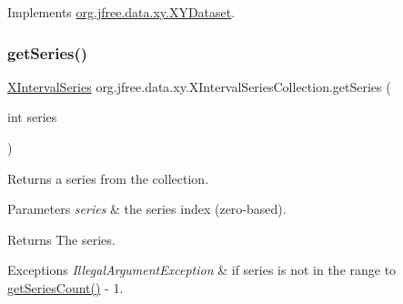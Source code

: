 Implements \mbox{\hyperlink{interfaceorg_1_1jfree_1_1data_1_1xy_1_1_x_y_dataset_ae81f9de91dfcae45028fc8a486a119da}{org.\+jfree.\+data.\+xy.\+X\+Y\+Dataset}}.

\mbox{\label{classorg_1_1jfree_1_1data_1_1xy_1_1_x_interval_series_collection_a8c8faf60eccaab2c360d7146925d4205}} 
\subsubsection{\texorpdfstring{get\+Series()}{getSeries()}}
{\footnotesize\ttfamily \mbox{\hyperlink{classorg_1_1jfree_1_1data_1_1xy_1_1_x_interval_series}{X\+Interval\+Series}} org.\+jfree.\+data.\+xy.\+X\+Interval\+Series\+Collection.\+get\+Series (\begin{DoxyParamCaption}\item[{int}]{series }\end{DoxyParamCaption})}

Returns a series from the collection.


\begin{DoxyParams}{Parameters}
{\em series} & the series index (zero-\/based).\\
\hline
\end{DoxyParams}
\begin{DoxyReturn}{Returns}
The series.
\end{DoxyReturn}

\begin{DoxyExceptions}{Exceptions}
{\em Illegal\+Argument\+Exception} & if {\ttfamily series} is not in the range {} to {\ttfamily \mbox{\hyperlink{classorg_1_1jfree_1_1data_1_1xy_1_1_x_interval_series_collection_ad9ed84e38a8cce0df6501925618efdf7}{get\+Series\+Count()}} -\/ 1}. \\
\hline
\end{DoxyExceptions}
\mbox{\label{classorg_1_1jfree_1_1data_1_1xy_1_1_x_interval_series_collection_ad9ed84e38a8cce0df6501925618efdf7}} 
